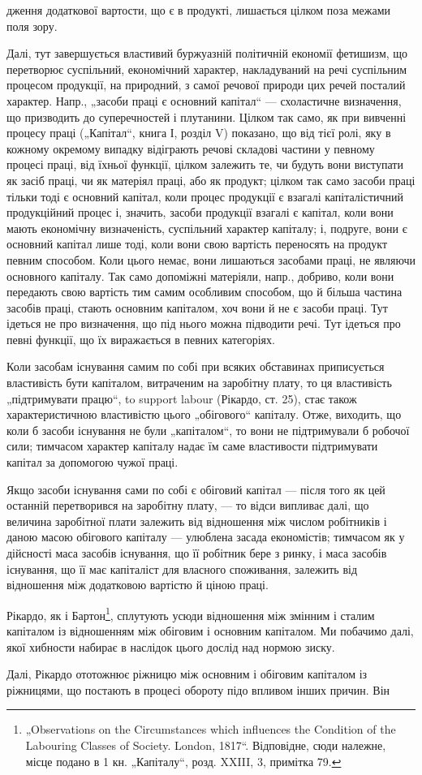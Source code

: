 дження додаткової вартости, що є в продукті, лишається цілком поза
межами поля зору.

Далі, тут завершується властивий буржуазній політичній економії фетишизм,
що перетворює суспільний, економічний характер, накладуваний
на речі суспільним процесом продукції, на природний, з самої речової
природи цих речей посталий характер. Напр., „засоби праці є основний
капітал“ — схоластичне визначення, що призводить до суперечностей і плутанини.
Цілком так само, як при вивченні процесу праці („Капітал“, книга
І, розділ V) показано, що від тієї ролі, яку в кожному окремому
випадку відіграють речові складові частини у певному процесі праці,
від їхньої функції, цілком залежить те, чи будуть вони виступати як
засіб праці, чи як матеріял праці, або як продукт; цілком так само засоби
праці тільки тоді є основний капітал, коли процес продукції є взагалі
капіталістичний продукційний процес і, значить, засоби продукції
взагалі є капітал, коли вони мають економічну визначеність, суспільний
характер капіталу; і, подруге, вони є основний капітал лише тоді, коли
вони свою вартість переносять на продукт певним способом. Коли цього
немає, вони лишаються засобами праці, не являючи основного капіталу.
Так само допоміжні матеріяли, напр., добриво, коли вони передають
свою вартість тим самим особливим способом, що й більша частина засобів
праці, стають основним капіталом, хоч вони й не є засоби праці.
Тут ідеться не про визначення, що під нього можна підводити речі. Тут
ідеться про певні функції, що їх виражається в певних категоріях.

Коли засобам існування самим по собі при всяких обставинах приписується
властивість бути капіталом, витраченим на заробітну плату, то
ця властивість „підтримувати працю“, to support labour (Рікардо, ст. 25),
стає також характеристичною властивістю цього „обігового“ капіталу.
Отже, виходить, що коли б засоби існування не були „капіталом“, то
вони не підтримували б робочої сили; тимчасом характер капіталу надає
їм саме властивости підтримувати капітал за допомогою чужої праці.

Якщо засоби існування сами по собі є обіговий капітал — після того
як цей останній перетворився на заробітну плату, — то відси випливає
далі, що величина заробітної плати залежить від відношення між числом
робітників і даною масою обігового капіталу — улюблена засада економістів;
тимчасом як у дійсності маса засобів існування, що її робітник
бере з ринку, і маса засобів існування, що її має капіталіст для власного
споживання, залежить від відношення між додатковою вартістю й ціною
праці.

Рікардо, як і Бартон\footnote{
„Observations on the Circumstances which influences the Condition of the
Labouring Classes of Society. London, 1817“. Відповідне, сюди належне, місце
подано в 1 кн. „Капіталу“, розд. XXIII, 3, примітка 79.
}, сплутують усюди відношення між змінним і сталим
капіталом із відношенням між обіговим і основним капіталом. Ми побачимо
далі, якої хибности набирає в наслідок цього дослід над нормою зиску.

Далі, Рікардо ототожнює ріжницю між основним і обіговим капіталом із
ріжницями, що постають в процесі обороту підо впливом інших причин. Він